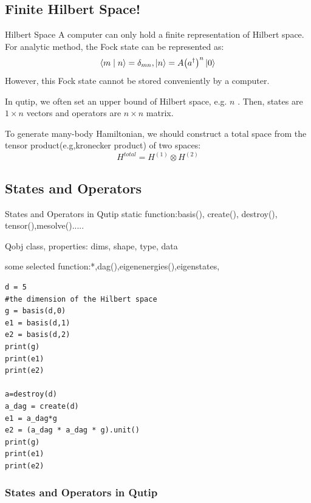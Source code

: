 \documentclass{beamer}
\begin{document}
\subsection{Finite Hilbert Space!}
\begin{frame}{Hilbert Space}
A computer can only hold a finite representation of Hilbert space. For analytic method, the Fock state can be represented as:
\[\left\langle {m}
\mathrel{\left | {\vphantom {m n}}
	\right. \kern-\nulldelimiterspace}
{n} \right\rangle  = {\delta _{mn}},\left| n \right\rangle  = A{\left( {{a^\dag }} \right)^n}\left| 0 \right\rangle \]
However, this Fock state cannot be stored conveniently by a computer. 

In qutip, we often set an upper bound of Hilbert space, e.g. $n$ . Then, states are $1\times n$ vectors and operators are $n \times n$ matrix.

To generate many-body Hamiltonian, we should construct a total space from the tensor product(e.g,kronecker product) of two spaces: 
\[{H^{total}} = {H^{\left( 1 \right)}} \otimes {H^{\left( 2 \right)}}\]
\end{frame}

\subsection{States and Operators}
\begin{frame}{States and Operators in Qutip}
static function:basis(), create(), destroy(), tensor(),mesolve().....

Qobj class, properties: 
dims,
shape,
type,
data

some selected function:*,dag(),eigenenergies(),eigenstates,
\end{frame}
\begin{lstlisting}
d = 5
#the dimension of the Hilbert space
g = basis(d,0)
e1 = basis(d,1)
e2 = basis(d,2)
print(g)
print(e1)
print(e2)

a=destroy(d)
a_dag = create(d)
e1 = a_dag*g
e2 = (a_dag * a_dag * g).unit()
print(g)
print(e1)
print(e2)
\end{lstlisting}\frametitle{States and Operators in Qutip}
\end{document}
